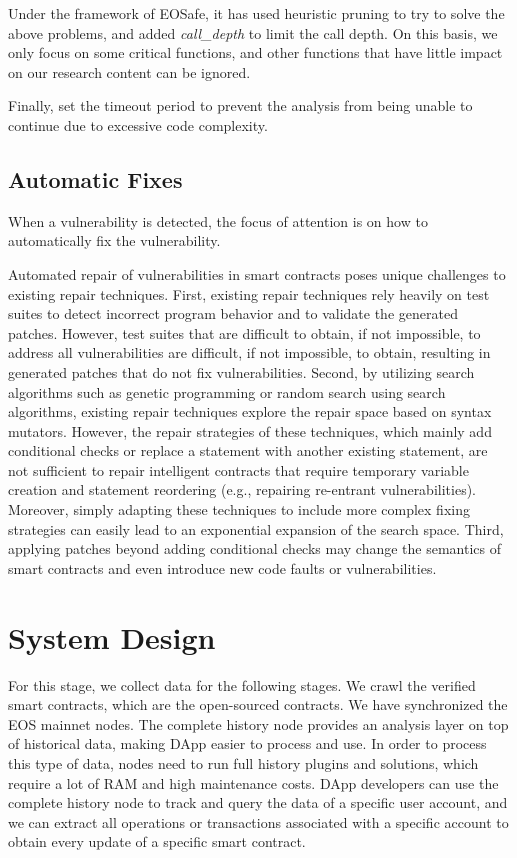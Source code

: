 \documentclass[a4paper, 10pt, conference, twocolumn]{ieeeconf}       %
\begin{document}
Under the framework of EOSafe,
it has used heuristic pruning to try to solve the above problems,
and added \emph{call\_depth} to limit the call depth. On this basis,
we only focus on some critical functions,
and other functions that have little impact on our research content can be ignored.

Finally, set the timeout period to prevent the analysis from being unable to continue due to excessive code complexity.

\subsection{Automatic Fixes}

When a vulnerability is detected, the focus of attention is on how to automatically fix the vulnerability.

Automated repair of vulnerabilities in smart contracts poses unique challenges to existing repair techniques.
First, existing repair techniques rely heavily on test suites to detect incorrect program behavior and to validate the generated patches.
However, test suites that are difficult to obtain, if not impossible, to address all vulnerabilities are difficult, if not impossible, to obtain, resulting in generated patches that do not fix vulnerabilities.
Second, by utilizing search algorithms such as genetic programming or random search using search algorithms, existing repair techniques explore the repair space based on syntax mutators.
However, the repair strategies of these techniques, which mainly add conditional checks or replace a statement with another existing statement, are not sufficient to repair intelligent contracts that require temporary variable creation and statement reordering (e.g., repairing re-entrant vulnerabilities).
Moreover, simply adapting these techniques to include more complex fixing strategies can easily lead to an exponential expansion of the search space.
Third, applying patches beyond adding conditional checks may change the semantics of smart contracts and even introduce new code faults or vulnerabilities.

\section{System Design}


For this stage, we collect data for the following stages.
We crawl the verified smart contracts, which are the open-sourced contracts.
We have synchronized the EOS mainnet nodes.
The complete history node provides an analysis layer on top of historical data,
making DApp easier to process and use.
In order to process this type of data, nodes need to run full history plugins and solutions,
which require a lot of RAM and high maintenance costs.
DApp developers can use the complete history node to track and query the data of a specific user account,
and we can extract all operations or transactions associated with a specific account to obtain every update of a specific smart contract.
\end{document}
